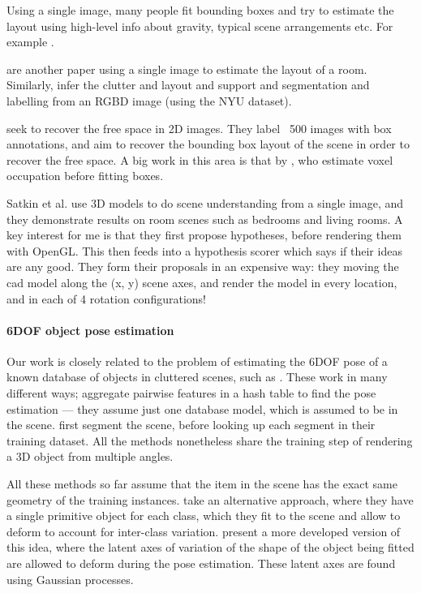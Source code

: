 \documentclass[10pt,twocolumn,letterpaper]{article}
\makeatletter
\newcommand*{\ea}{et al.\@\xspace}
\makeatother
\begin{document}
Using a single image, many people fit bounding boxes and try to estimate the layout using high-level info about gravity, typical scene arrangements etc. 
For example \cite{choi-cvpr-2013}.

\cite{lee-nips-2010} are another paper using a single image to estimate the layout of a room. 
Similarly, \cite{zhang-iccv-2013} infer the clutter and layout and support and segmentation and labelling from an RGBD image (using the NYU dataset).

\cite{hedau-cvpr-2012} seek to recover the free space in 2D images. 
They label ~500 images with box annotations, and aim to recover the bounding box layout of the scene in order to recover the free space. 
A big work in this area is that by \cite{gupta-cvpr-2011}, who estimate voxel occupation before fitting boxes.

Satkin \ea \cite{satkin-bmvc-2012} use 3D models to do scene understanding from a single image, and they demonstrate results on room scenes such as bedrooms and living rooms. 
A key interest for me is that they first propose hypotheses, before rendering them with OpenGL.
This then feeds into a hypothesis scorer which says if their ideas are any good. 
They form their proposals in an expensive way: they moving the cad model along the (x, y) scene axes, and render the model in every location, and in each of 4 rotation configurations!

\paragraph{6DOF object pose estimation}
Our work is closely related to the problem of estimating the 6DOF pose of a known database of objects in cluttered scenes, such as \cite{hinterstoisser-accv-2012, drost-3dimpvt-2012, rusu-iros-2010}. 
These work in many different ways; \cite{drost-3dimpvt-2012} aggregate pairwise features in a hash table to find the pose estimation --- they assume just one database model, which is assumed to be in the scene. \cite{rusu-iros-2010} first segment the scene, before looking up each segment in their training dataset.
All the methods nonetheless share the training step of rendering a 3D object from multiple angles.

All these methods so far assume that the item in the scene has the exact same geometry of the training instances.
\cite{cocias-cgvcv-2013} take an alternative approach, where they have a single primitive object for each class, which they fit to the scene and allow to deform to account for inter-class variation.
\cite{prisacariu-iccv-2011} present a more developed version of this idea, where the latent axes of variation of the shape of the object being fitted are allowed to deform during the pose estimation. 
These latent axes are found using Gaussian processes.
\end{document}
